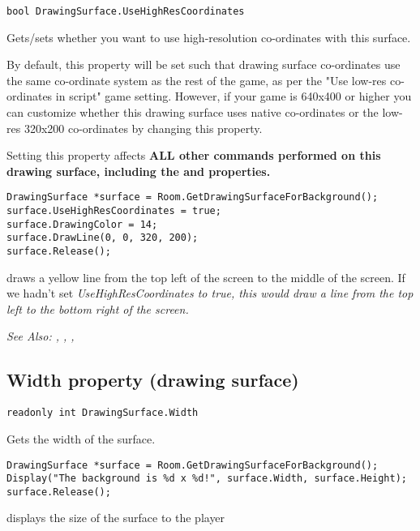 \begin{verbatim}
bool DrawingSurface.UseHighResCoordinates
\end{verbatim}
Gets/sets whether you want to use high-resolution co-ordinates with this surface.

By default, this property will be set such that drawing surface co-ordinates use the same
co-ordinate system as the rest of the game, as per the "Use low-res co-ordinates in script"
game setting. However, if your game is 640x400 or higher you can customize whether
this drawing surface uses native co-ordinates or the low-res 320x200 co-ordinates by
changing this property.

Setting this property affects \bf{ALL} other commands performed on this drawing
surface, including the  and 
properties.

\begin{verbatim}
DrawingSurface *surface = Room.GetDrawingSurfaceForBackground();
surface.UseHighResCoordinates = true;
surface.DrawingColor = 14;
surface.DrawLine(0, 0, 320, 200);
surface.Release();
\end{verbatim}
draws a yellow line from the top left of the screen to the middle of the screen. If we
hadn't set \it{UseHighResCoordinates} to true, this would draw a line from the top left
to the bottom right of the screen.

\it{See Also:} , ,
,


\subsection{Width property (drawing surface)}\label{DrawingSurface.Width}%

\begin{verbatim}
readonly int DrawingSurface.Width
\end{verbatim}
Gets the width of the surface.

\begin{verbatim}
DrawingSurface *surface = Room.GetDrawingSurfaceForBackground();
Display("The background is %d x %d!", surface.Width, surface.Height);
surface.Release();
\end{verbatim}
displays the size of the surface to the player

